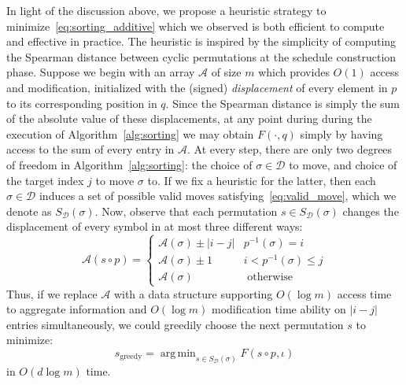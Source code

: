 \documentclass[sn-mathphys]{sn-jnl}
\DeclareMathOperator*{\argmin}{arg\,min}
\begin{document}
In light of the discussion above, we propose a heuristic strategy to minimize~\eqref{eq:sorting_additive} which we observed is both efficient to compute and effective in practice.
The heuristic is inspired by the simplicity of computing the Spearman distance between cyclic permutations at the schedule construction phase. Suppose we begin with an array $\mathcal{A}$ of size $m$ which provides $O(1)$ access and modification, initialized with the (signed) \emph{displacement} of every element in $p$ to its corresponding position in $q$. Since the Spearman distance is simply the sum of the absolute value of these displacements, at any point during during the execution of Algorithm~\ref{alg:sorting} we may obtain $F(\cdot, q)$ simply by having access to the sum of every entry in $\mathcal{A}$. At every step, there are only two degrees of freedom in Algorithm~\ref{alg:sorting}: the choice of $\sigma \in \mathcal{D}$ to move, and choice of the target index $j$ to move $\sigma$ to. If we fix a heuristic for the latter, then each $\sigma \in \mathcal{D}$ induces a set of possible valid moves satisfying~\eqref{eq:valid_move}, which we denote as $S_\mathcal{D}(\sigma)$. Now, observe that each permutation $s \in S_\mathcal{D}(\sigma)$ changes the displacement of every symbol in at most three different ways: 
\[
\mathcal{A}(s \circ p) = 
\begin{cases} 
	 \mathcal{A}(\sigma) \pm \lvert i - j \rvert & p^{-1}(\sigma) = i \\
	 \mathcal{A}(\sigma) \pm 1 & i < p^{-1}(\sigma) \leq j \\
	 \mathcal{A}(\sigma) & \text{ otherwise }
\end{cases}
\]
Thus, if we replace $\mathcal{A}$ with a data structure  supporting $O(\log m)$ access time to aggregate information and $O(\log m)$ modification time ability on $\lvert i - j \vert$ entries simultaneously, we could greedily choose the next permutation $s$ to minimize:
\begin{equation}\label{eq:greedy_step}
	s_{\text{greedy}} = \argmin_{s \in S_{\mathcal{D}}(\sigma)} F(s\circ p, \iota)
\end{equation}  
in $O(d\log m)$ time. 
\end{document}
